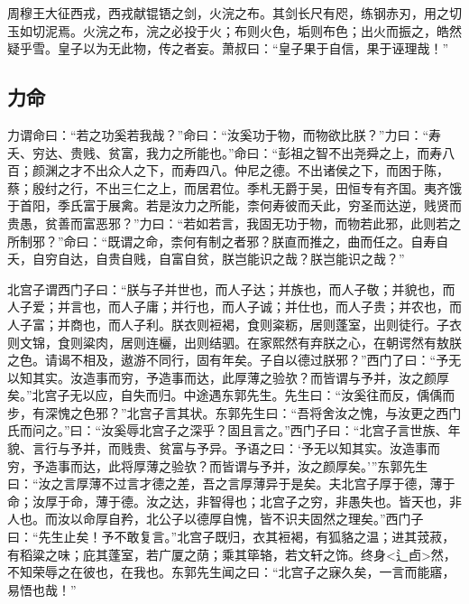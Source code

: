 \documentclass[]{article}
\begin{document}
周穆王大征西戎，西戎献锟铻之剑，火浣之布。其剑长尺有咫，练钢赤刃，用之切玉如切泥焉。火浣之布，浣之必投于火；布则火色，垢则布色；出火而振之，皓然疑乎雪。皇子以为无此物，传之者妄。萧叔曰：``皇子果于自信，果于诬理哉！''

\hypertarget{header-n97}{%
\subsection{力命}\label{header-n97}}

力谓命曰：``若之功奚若我哉？''命曰：``汝奚功于物，而物欲比朕？''力曰：``寿夭、穷达、贵贱、贫富，我力之所能也。''命曰：``彭祖之智不出尧舜之上，而寿八百；颜渊之才不出众人之下，而寿四八。仲尼之德。不出诸侯之下，而困于陈，蔡；殷纣之行，不出三仁之上，而居君位。季札无爵于吴，田恒专有齐国。夷齐饿于首阳，季氏富于展禽。若是汝力之所能，柰何寿彼而夭此，穷圣而达逆，贱贤而贵愚，贫善而富恶邪？''力曰：``若如若言，我固无功于物，而物若此邪，此则若之所制邪？''命曰：``既谓之命，柰何有制之者邪？朕直而推之，曲而任之。自寿自夭，自穷自达，自贵自贱，自富自贫，朕岂能识之哉？朕岂能识之哉？''

北宫子谓西门子曰：``朕与子并世也，而人子达；并族也，而人子敬；并貌也，而人子爱；并言也，而人子庸；并行也，而人子诚；并仕也，而人子贵；并农也，而人子富；并商也，而人子利。朕衣则裋褐，食则粢粝，居则蓬室，出则徒行。子衣则文锦，食则粱肉，居则连欐，出则结驷。在家熙然有弃朕之心，在朝谔然有敖朕之色。请谒不相及，遨游不同行，固有年矣。子自以德过朕邪？''西门了曰：``予无以知其实。汝造事而穷，予造事而达，此厚薄之验欤？而皆谓与予并，汝之颜厚矣。''北宫子无以应，自失而归。中途遇东郭先生。先生曰：``汝奚往而反，偊偊而步，有深愧之色邪？''北宫子言其状。东郭先生曰：``吾将舍汝之愧，与汝更之西门氏而问之。''曰：``汝奚辱北宫子之深乎？固且言之。''西门子曰：``北宫子言世族、年貌、言行与予并，而贱贵、贫富与予异。予语之曰：`予无以知其实。汝造事而穷，予造事而达，此将厚薄之验欤？而皆谓与予并，汝之颜厚矣。'''东郭先生曰：``汝之言厚薄不过言才德之差，吾之言厚薄异于是矣。夫北宫子厚于德，薄于命；汝厚于命，薄于德。汝之达，非智得也；北宫子之穷，非愚失也。皆天也，非人也。而汝以命厚自矜，北公子以德厚自愧，皆不识夫固然之理矣。''西门子曰：``先生止矣！予不敢复言。''北宫子既归，衣其裋褐，有狐貉之温；进其茙菽，有稻粱之味；庇其蓬室，若广厦之荫；乘其筚辂，若文轩之饰。终身\textless{}辶卣\textgreater{}然，不知荣辱之在彼也，在我也。东郭先生闻之曰：``北宫子之寐久矣，一言而能寤，易悟也哉！''
\end{document}

